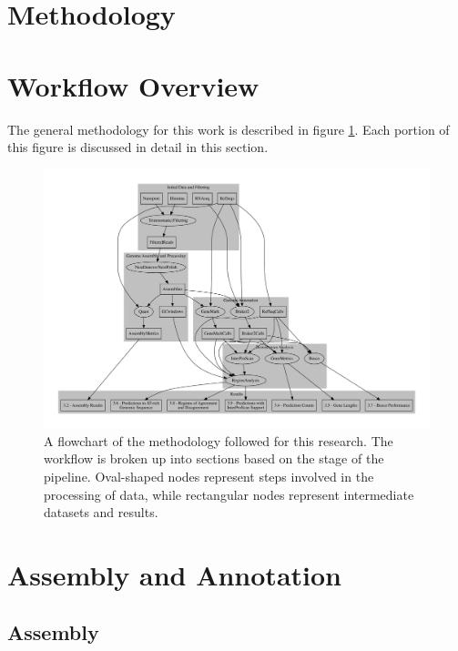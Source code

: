 \section{Methodology}

\section{Workflow Overview}

The general methodology for this work is described in figure
\ref{fig:workflow}. Each portion of this figure is discussed in detail
in this section.

\begin{center}
  \begin{figure}
    \includegraphics[width=1.15\textwidth]{./figures/data-flowchart.pdf}
    \caption{A flowchart of the methodology followed for this
      research. The workflow is broken up into sections based on the
      stage of the pipeline. Oval-shaped nodes represent steps
      involved in the processing of data, while rectangular nodes
      represent intermediate datasets and results.}
    \label{fig:workflow}
  \end{figure}
\end{center}
      
\section{Assembly and Annotation}

\subsection{Assembly}

